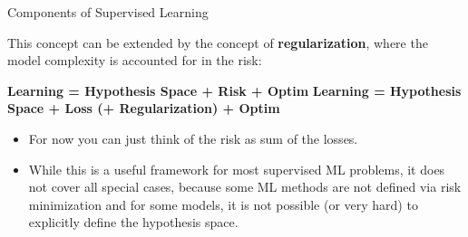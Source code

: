 \documentclass[11pt,compress,t,notes=noshow, xcolor=table]{beamer}
\begin{document}
\begin{vbframe}{Components of Supervised Learning}

This concept can be extended by the concept of \textbf{regularization}, where the model complexity is accounted for in the risk:

\lz


  \textbf{Learning = Hypothesis Space +  Risk + Optim }
  \textbf{Learning = Hypothesis Space + Loss (+ Regularization) + Optim}


\lz

\begin{itemize}

  \item For now you can just think of the risk as sum of the losses.

  \item While this is a useful framework for most supervised ML problems, it does not cover all special cases, because some ML methods are not defined via risk minimization and for some models, it is not possible (or very hard) to explicitly define the hypothesis space.

\end{itemize}

\end{vbframe}

\end{document}
